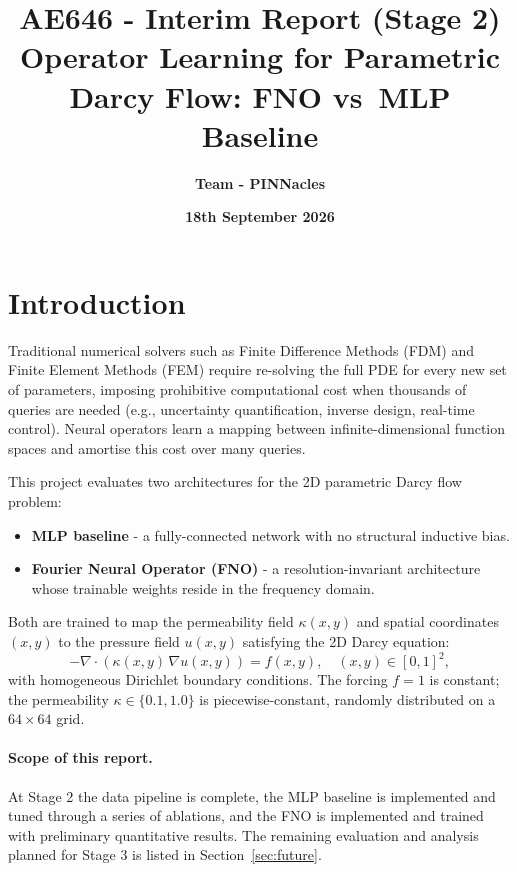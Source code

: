 \documentclass[11pt,a4paper]{article}
\title{\textbf{AE646 - Interim Report (Stage 2)}\\[0.5em]
\large \textbf{Operator Learning for Parametric Darcy Flow: FNO vs\ MLP Baseline}}
\author{\textbf{Team - PINNacles}}
\date{\textbf{18th September 2026}}
\begin{document}
\maketitle

\section{Introduction}

Traditional numerical solvers such as Finite Difference Methods (FDM) and Finite Element Methods (FEM) require re-solving the full PDE for every new set of parameters, imposing prohibitive computational cost when thousands of queries are needed (e.g., uncertainty quantification, inverse design, real-time control). Neural operators learn a mapping between infinite-dimensional function spaces and amortise this cost over many queries.

This project evaluates two architectures for the 2D parametric Darcy flow problem:
\begin{itemize}[nosep]
  \item \textbf{MLP baseline} - a fully-connected network with no structural inductive bias.
  \item \textbf{Fourier Neural Operator (FNO)} \cite{li2021fno} - a resolution-invariant architecture whose trainable weights reside in the frequency domain.
\end{itemize}

Both are trained to map the permeability field $\kappa(x,y)$ and spatial coordinates $(x,y)$ to the pressure field $u(x,y)$ satisfying the 2D Darcy equation:
\begin{equation}
  -\nabla \cdot (\kappa(x,y)\,\nabla u(x,y)) = f(x,y), \quad (x,y)\in[0,1]^2,
  \label{eq:darcy}
\end{equation}
with homogeneous Dirichlet boundary conditions. The forcing $f = 1$ is constant; the permeability $\kappa \in \{0.1, 1.0\}$ is piecewise-constant, randomly distributed on a $64\times 64$ grid.

\paragraph{Scope of this report.} At Stage 2 the data pipeline is complete, the MLP baseline is implemented and tuned through a series of ablations, and the FNO is implemented and trained with preliminary quantitative results. The remaining evaluation and analysis planned for Stage 3 is listed in Section~\ref{sec:future}.
\end{document}
